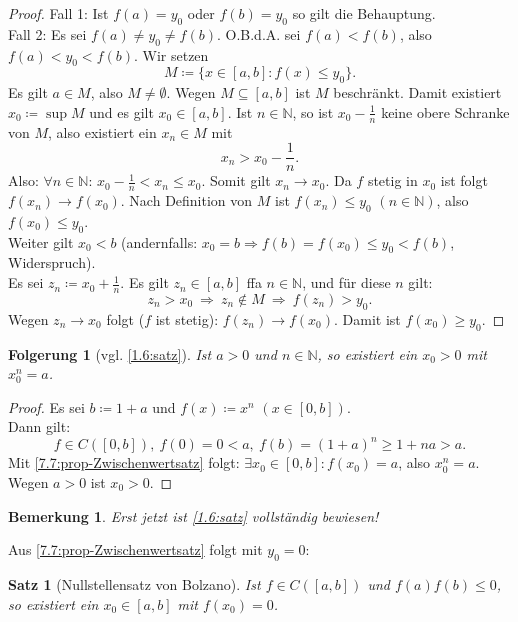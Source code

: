 \documentclass[12pt]{extreport} %
\newcommand{\N}{\mathbb{N}}
\theoremstyle{named}
\theoremstyle{itshape}
\newtheorem{satz}[unnamedtheorem]{Satz}
\theoremstyle{normal}
\newtheorem*{bemerkung}{Bemerkung}
\newtheorem*{folgerung*}{Folgerung}
\begin{document}
\begin{proof}
	Fall 1: Ist $f(a) = y_{0}$ oder $f(b) = y_{0}$ so gilt die Behauptung. \\
	Fall 2: Es sei $f(a) \neq y_{0} \neq f(b)$. O.B.d.A. sei $f(a) < f(b)$, also $f(a) < y_{0} < f(b)$. Wir setzen
	$$ M \coloneqq \{ x \in [a, b]: f(x) \leq y_{0} \}. $$
	Es gilt $a \in M$, also $M \neq \emptyset$. Wegen $M \subseteq [a, b]$ ist $M$ beschränkt. Damit existiert $x_{0} \coloneqq \sup M$ und es gilt $x_0 \in [a, b]$. 
	Ist $n \in \N$, so ist $x_{0} - \frac{1}{n}$ keine obere Schranke von $M$, also existiert ein $x_{n} \in M$ mit
		$$ x_{n} > x_{0} - \frac{1}{n}. $$
	Also: $\forall n \in \N$: $x_{0} - \frac{1}{n} < x_{n} \leq x_{0}$. Somit gilt $x_{n} \rightarrow x_{0}$. Da $f$ stetig in $x_{0}$ ist folgt $f(x_{n}) \rightarrow f(x_{0})$.
	Nach Definition von $M$ ist $f(x_{n}) \leq y_{0}$ $(n \in \N)$, also $f(x_{0}) \leq y_{0}$. \\
	Weiter gilt $x_{0} < b$ (andernfalls: $x_{0} = b \Rightarrow f(b) = f(x_{0}) \leq y_{0} < f(b)$, Widerspruch). \\
	Es sei $z_{n} \coloneqq x_{0} + \frac{1}{n}$. Es gilt $z_{n} \in [a, b]$ ffa $n \in \N$, und für diese $n$ gilt:
	$$
	z_{n} > x_{0} ~ \Rightarrow ~ z_{n} \notin M ~ \Rightarrow ~ f(z_{n}) > y_{0}.
	$$
	Wegen $z_{n} \rightarrow x_{0}$ folgt ($f$ ist stetig): $f(z_{n}) \rightarrow f(x_{0})$. Damit ist $f(x_{0}) \geq y_{0}$.
\end{proof}


\begin{folgerung*}[vgl. \ref{1.6:satz}]
	Ist $a > 0$ und $n \in \N$, so existiert ein $x_{0} > 0$ mit $x_{0}^{n} = a$.	
\end{folgerung*}

\begin{proof}
	Es sei $b \coloneqq 1 + a$ und $f(x) \coloneqq x^{n}$ $(x \in [0, b])$. \\
	Dann gilt: 
	$$
	f \in C([0, b]), ~ f(0) = 0 < a, ~  f(b) = (1 + a)^{n} \geq 1 + n a > a.
	$$
	Mit \ref{7.7:prop-Zwischenwertsatz} folgt: $\exists x_{0} \in [0, b]: f(x_{0}) = a$, also $x_{0}^{n} = a$. Wegen $a > 0$ ist $x_0 > 0$.
\end{proof}

\begin{bemerkung}
	Erst jetzt ist \ref{1.6:satz} vollständig bewiesen!
\end{bemerkung}


Aus \ref{7.7:prop-Zwischenwertsatz} folgt mit $y_{0} = 0$:

\begin{satz}[Nullstellensatz von Bolzano] \label{7.8:prop-NullstellensatzVonBolzano}
	Ist $f \in C\left([a, b]\right)$ und $f(a)f(b) \leq 0$, so existiert ein $x_{0} \in [a, b]$ mit $f(x_{0}) = 0$.	
\end{satz}
\end{document}
